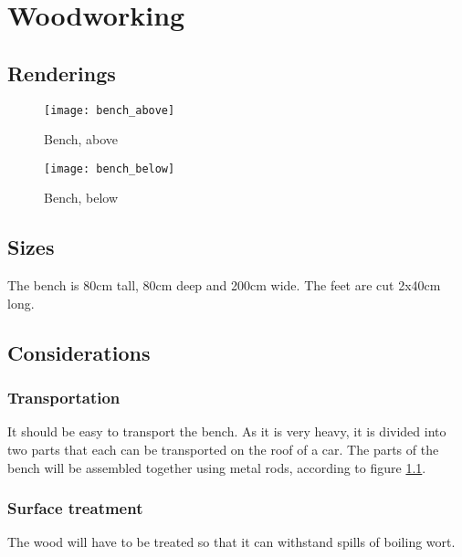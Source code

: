 \documentclass[11pt,fleqn]{book} %
\begin{document}


\chapter{Woodworking}

\section{Renderings}

\begin{figure}[h]
\centering\texttt{[image: bench\_above]}
\caption{Bench, above}
\label{bench_above}
\end{figure}

\begin{figure}[h]
\centering\texttt{[image: bench\_below]}
\caption{Bench, below}
\end{figure}

\section{Sizes}

The bench is 80cm tall, 80cm deep and 200cm wide. The feet are cut 2x40cm long.

\section{Considerations}

\subsection{Transportation}

It should be easy to transport the bench. As it is very heavy, it is divided into two parts that each can be transported on the roof of a car. The parts of the bench will be assembled together using metal rods, according to figure \ref{bench_above}.

\subsection{Surface treatment}

The wood will have to be treated so that it can withstand spills of boiling wort.

\end{document}

